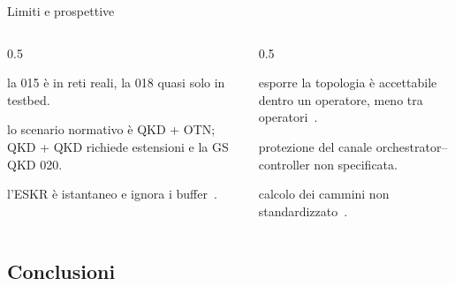 \documentclass[10pt]{beamer}
\begin{document}
\begin{frame}{Limiti e prospettive}
  \begin{columns}[T]
    \begin{column}{0.5\textwidth}
      \begin{description}\small
        \item[Adozione] la 015 è in reti reali, la 018 quasi solo in
              testbed.
        \item[Multi-dominio] lo scenario normativo è QKD + OTN; QKD + QKD
              richiede estensioni e la GS QKD 020.
        \item[Metriche] l'ESKR è istantaneo e ignora i buffer~\cite{laschet2026}.
      \end{description}
    \end{column}
    \begin{column}{0.5\textwidth}
      \begin{description}[Riservatezza]\small
        \item[Riservatezza] esporre la topologia è accettabile dentro un
              operatore, meno tra operatori~\cite{laschet2026,interconnect2026}.
        \item[Sicurezza] protezione del canale orchestrator–controller non
              specificata.
        \item[Algoritmi] calcolo dei cammini non standardizzato~\cite{routing2024,mendez2026}.
      \end{description}
    \end{column}
  \end{columns}
\end{frame}

\subsection{Conclusioni}
\end{document}
